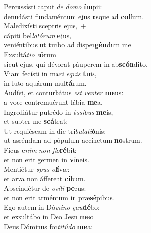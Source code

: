 \evenverse Percussísti caput \textit{de} \textit{do}\textit{mo} \textbf{ím}pii:~\*\\
\evenverse denudásti fundaméntum ejus usque ad \textbf{col}lum.\\
\oddverse Maledixísti sceptris ejus,~+\\
\oddverse  cápiti bel\textit{la}\textit{tó}\textit{rum} \textbf{e}jus,~\*\\
\oddverse veniéntibus ut turbo ad disper\textbf{gén}dum me.\\
\evenverse Exsultá\textit{ti}\textit{o} \textit{e}\textbf{ó}rum,~\*\\
\evenverse sicut ejus, qui dévorat páuperem in ab\textbf{scón}dito.\\
\oddverse Viam fecísti in ma\textit{ri} \textit{e}\textit{quis} \textbf{tu}is,~\*\\
\oddverse in luto aquárum mul\textbf{tá}rum.\\
\evenverse Audívi, et conturbátus \textit{est} \textit{ven}\textit{ter} \textbf{me}us:~\*\\
\evenverse a voce contremuérunt lábia \textbf{me}a.\\
\oddverse Ingrediátur putrédo in \textit{ós}\textit{si}\textit{bus} \textbf{me}is,~\*\\
\oddverse et subter me \textbf{scá}teat;\\
\evenverse Ut requiéscam in die tri\textit{bu}\textit{la}\textit{ti}\textbf{ó}nis:~\*\\
\evenverse ut ascéndam ad pópulum accínctum \textbf{no}strum.\\
\oddverse Ficus e\textit{nim} \textit{non} \textit{flo}\textbf{ré}bit:~\*\\
\oddverse et non erit germen in \textbf{ví}neis.\\
\evenverse Mentiétur \textit{o}\textit{pus} \textit{o}\textbf{lí}væ:~\*\\
\evenverse et arva non áfferent \textbf{ci}bum.\\
\oddverse Abscindétur de \textit{o}\textit{ví}\textit{li} \textbf{pe}cus:~\*\\
\oddverse et non erit arméntum in præ\textbf{sé}pibus.\\
\evenverse Ego autem in Dó\textit{mi}\textit{no} \textit{gau}\textbf{dé}bo:~\*\\
\evenverse et exsultábo in Deo Jesu \textbf{me}o.\\
\oddverse Deus Dóminus for\textit{ti}\textit{tú}\textit{do} \textbf{me}a:~\*\\
